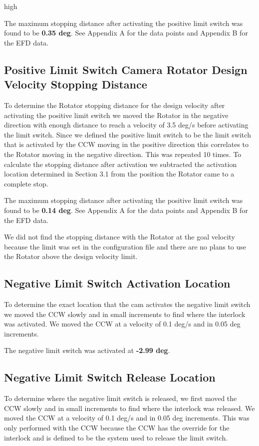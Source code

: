 high\documentclass[SE,lsstdraft,authoryear,toc]{lsstdoc}
\begin{document}
The maximum stopping distance after activating the positive limit switch
was found to be \textbf{0.35 deg}. See Appendix A for the data points
and Appendix B for the EFD data.

\subsection{Positive Limit Switch Camera Rotator Design Velocity Stopping Distance}

To determine the Rotator stopping distance for the design velocity after
activating the positive limit switch we moved the Rotator in the
negative direction with enough distance to reach a velocity of 3.5 deg/s
before activating the limit switch. Since we defined the positive limit
switch to be the limit switch that is activated by the CCW moving in the
positive direction this correlates to the Rotator moving in the negative
direction. This was repeated 10 times. To calculate the stopping
distance after activation we subtracted the activation location
determined in Section 3.1 from the position the Rotator came to a
complete stop.

The maximum stopping distance after activating the positive limit switch
was found to be \textbf{0.14 deg}. See Appendix A for the data points
and Appendix B for the EFD data.

We did not find the stopping distance with the Rotator at the goal
velocity because the limit was set in the configuration file and there
are no plans to use the Rotator above the design velocity limit.

\subsection{Negative Limit Switch Activation Location}

To determine the exact location that the cam activates the negative
limit switch we moved the CCW slowly and in small increments to find
where the interlock was activated. We moved the CCW at a velocity of 0.1
deg/s and in 0.05 deg increments.

The negative limit switch was activated at \textbf{-2.99 deg}.

\subsection{Negative Limit Switch Release Location}

To determine where the negative limit switch is released, we first moved
the CCW slowly and in small increments to find where the interlock was
released. We moved the CCW at a velocity of 0.1 deg/s and in 0.05 deg
increments. This was only performed with the CCW because the CCW has the
override for the interlock and is defined to be the system used to
release the limit switch.
\end{document}
